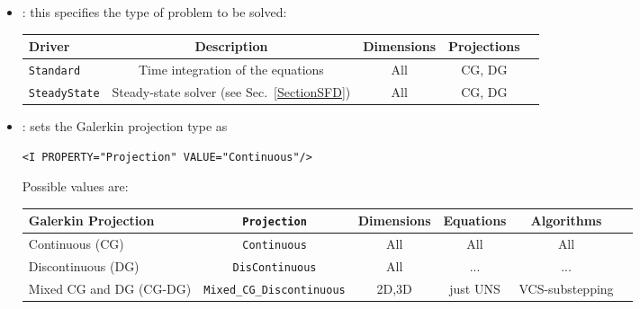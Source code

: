 \begin{itemize}
\item {}: this specifies the type of problem to be solved:

\begin{center}
\footnotesize
\begin{tabular}{lcccc}
\toprule
{Driver} & {Description} &{Dimensions}&{Projections} \\
\midrule
\texttt{Standard} & Time integration of the equations & All & CG, DG \\
\texttt{SteadyState} & Steady-state solver (see Sec.~\ref{SectionSFD})  & All & CG, DG \\
\bottomrule
\end{tabular}
\end{center}

\item {}: sets the Galerkin projection type as
\begin{lstlisting}[style=XMLStyle]
<I PROPERTY="Projection" VALUE="Continuous"/>
\end{lstlisting}

Possible values are:
\begin{center}
\footnotesize
\begin{tabular}{lccccc}
\toprule
{Galerkin Projection} & \texttt{Projection} &{Dimensions}&{Equations}&{Algorithms} \\
\midrule
Continuous (CG)&  \texttt{Continuous} & All & All & All \\
Discontinuous (DG) & \texttt{DisContinuous} & All &...&...\\
Mixed CG and DG (CG-DG) & \texttt{Mixed\_CG\_Discontinuous} & 2D,3D & just UNS & VCS-substepping \\
\bottomrule
\end{tabular}
\end{center}

\end{itemize}

